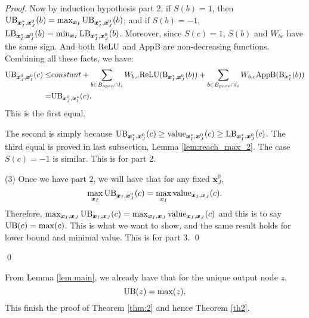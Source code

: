 \begin{proof}
				Now by induction hypothesis part 2, if $S(b)=1$, then $\mathrm{UB}_{\boldsymbol{x}^*_I,\boldsymbol{x}^0_J}(b)=\max_{\boldsymbol{x}_I}\mathrm{UB}_{\boldsymbol{x}^*_I,\boldsymbol{x}^0_J}(b)$; and if $S(b)=-1$, $\mathrm{LB}_{\boldsymbol{x}^*_I,\boldsymbol{x}^0_J}(b)=\min_{\boldsymbol{x}_I}\mathrm{LB}_{\boldsymbol{x}^*_I,\boldsymbol{x}^0_J}(b)$. Moreover, since $S(c)=1$, $S(b)$ and $W_{bc}$ have the same sign. And both $\mathrm{ReLU}$ and $\mathrm{AppB}$ are non-decreasing functions. Combining all these facts, we have:\begin{align*}
					\mathrm{UB}_{\boldsymbol{x}^0_J,\boldsymbol{x}^0_I}(c)\leq 
					&constant + \sum_{b\in B_{open}\cap l_i} W_{b,c}\mathrm{ReLU}(\mathrm{B}_{\boldsymbol{x}^*_I,\boldsymbol{x}^0_J}(b)) + \sum_{b\in B_{pure}\cap l_{i}} W_{b,c} \mathrm{AppB}(\mathrm{B}_{\boldsymbol{x}^*_I}(b))\\
					= & \mathrm{UB}_{\boldsymbol{x}^0_J,\boldsymbol{x}^*_I}(c). 
				\end{align*}  This is the first equal.
				
				The second is simply because $\mathrm{UB}_{\boldsymbol{x}^*_I,\boldsymbol{x}^0_J}(c)\geq {\textrm{value}}_{\boldsymbol{x}^*_I,\boldsymbol{x}^0_J}(c)\geq\mathrm{LB}_{\boldsymbol{x}^*_I,\boldsymbol{x}^0_J}(c)$.	The third equal is proved in last subsection, Lemma \ref{lem:reach_max_2}. The case $S(c)=-1$ is similar. This is for part 2.
				
				(3) Once we have part 2, we will have that for any fixed $\boldsymbol{x}^0_J$, $$\max_{\boldsymbol{x}_I} \mathrm{UB}_{\boldsymbol{x}_I,\boldsymbol{x}^0_J}(c)= \max_{\boldsymbol{x}_I} {\textrm{value}}_{\boldsymbol{x}_I,\boldsymbol{x}_J}(c).$$ Therefore, $\max_{\boldsymbol{x}_I,\boldsymbol{x}_J} \mathrm{UB}_{\boldsymbol{x}_I,\boldsymbol{x}_J}(c)= \max_{\boldsymbol{x}_I,\boldsymbol{x}_J} {\textrm{value}}_{\boldsymbol{x}_I,\boldsymbol{x}_J}(c)$ and this is to say $\mathrm{UB}(c)=\max(c)$. This is what we want to show, and the same result holds for lower bound and minimal value. This is for part 3. \qed
				
				
				
				\qed
			\end{proof}
			
			From Lemma \ref{lem:main}, we already have that for the unique output node $z$, $$\mathrm{UB}(z)=\max(z).$$ This finish the proof of Theorem \ref{thm:2} and hence Theorem \ref{th2}.
			
			
